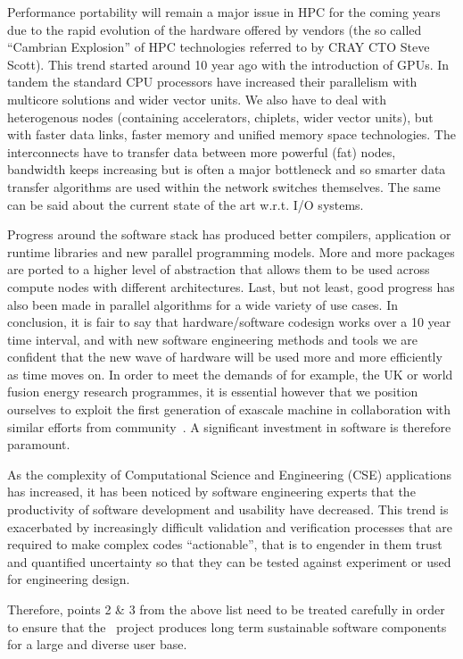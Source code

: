 \documentclass{article}
\begin{document}
Performance portability will remain a major issue in HPC for the coming years due 
to the rapid evolution of the hardware offered by vendors (the so called ``Cambrian 
Explosion'' of HPC technologies referred to by CRAY CTO Steve Scott). This trend 
started around 10 year ago with the introduction of GPUs. In tandem the standard 
CPU processors have increased their parallelism with multicore solutions and wider 
vector units.  We also have to deal with heterogenous nodes (containing accelerators, 
chiplets, wider vector units), but with faster data links, faster memory and unified 
memory space technologies. The interconnects have to transfer data between more 
powerful (fat) nodes, bandwidth keeps increasing but is often a major bottleneck 
and so smarter data transfer algorithms are used within the network switches themselves. 
The same can be said about the current state of the art w.r.t. I/O systems. 

Progress around the software stack has produced better compilers, application or 
runtime libraries and new parallel programming models. More and more packages are 
ported to a higher level of abstraction that allows them to be used across compute 
nodes with different architectures. Last, but not least, good progress has also 
been made in parallel algorithms for a wide variety of use cases. In conclusion, 
it is fair to say that hardware/software codesign works over a 10 year time interval, 
and with new software engineering methods and tools we are confident that the new 
wave of hardware will be used more and more efficiently as time moves on. In order 
to meet the demands of for example, the UK or world fusion energy research programmes, 
it is essential however that we position ourselves to exploit the first generation 
of exascale machine in collaboration with similar efforts from community~\cite{ref [3]}. A 
significant investment in software is therefore paramount.

As the complexity of Computational Science and Engineering (CSE) applications has 
increased, it has been noticed by software engineering experts that the productivity 
of software development and usability have decreased. This trend is exacerbated 
by increasingly difficult validation and verification processes that are required 
to make complex codes ``actionable'', that is to engender in them trust and quantified 
uncertainty so that they can be tested against experiment or used for engineering 
design.

Therefore, points 2 \& 3 from the above list need to be treated carefully in order 
to ensure that the \nep \   project produces long term sustainable software components 
for a large and diverse user base.
\end{document}
